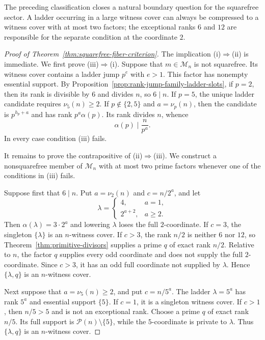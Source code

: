 The preceding classification closes a natural boundary question for the
squarefree sector.  A ladder occurring in a large witness cover can always be
compressed to a witness cover with at most two factors; the exceptional ranks
$6$ and $12$ are responsible for the separate condition at the coordinate
$2$.

\begin{proof}[Proof of Theorem~\ref{thm:squarefree-fiber-criterion}]
The implication \textup{(i)}$\Rightarrow$\textup{(ii)} is immediate.  We first
prove \textup{(iii)}$\Rightarrow$\textup{(i)}.  Suppose that
$m\in\mathcal M_n$ is not squarefree.  Its witness cover contains a ladder
jump $p^e$ with $e>1$.  This factor has nonempty essential support.  By
Proposition~\ref{prop:rank-jump-family-ladder-slots}, if $p=2$, then its rank
is divisible by $6$ and divides $n$, so $6\mid n$.  If $p=5$, the unique
ladder candidate requires $\nu_5(n)\geq2$.  If $p\notin\{2,5\}$ and
$a=\nu_p(n)$, then the candidate is $p^{h_p+a}$ and has rank
$p^a\alpha(p)$.  Its rank divides $n$, whence
\[
 \alpha(p)\mid \frac{n}{p^a}.
\]
In every case condition \textup{(iii)} fails.

It remains to prove the contrapositive of
\textup{(ii)}$\Rightarrow$\textup{(iii)}.  We construct a nonsquarefree
member of $\mathcal M_n$ with at most two prime factors whenever one of the
conditions in \textup{(iii)} fails.

Suppose first that $6\mid n$.  Put $a=\nu_2(n)$ and $c=n/2^a$, and let
\[
 \lambda=
 \begin{cases}
 4,&a=1,\\
 2^{a+2},&a\geq2.
 \end{cases}
\]
Then $\alpha(\lambda)=3\cdot2^a$ and lowering $\lambda$ loses the full
$2$-coordinate.  If $c=3$, the singleton $\{\lambda\}$ is an $n$-witness
cover.  If $c>3$, the rank $n/2$ is neither $6$ nor $12$, so
Theorem~\ref{thm:primitive-divisors} supplies a prime $q$ of exact rank
$n/2$.  Relative to $n$, the factor $q$ supplies every odd coordinate and
does not supply the full $2$-coordinate.  Since $c>3$, it has an odd full
coordinate not supplied by $\lambda$.  Hence $\{\lambda,q\}$ is an
$n$-witness cover.

Next suppose that $a=\nu_5(n)\geq2$, and put $c=n/5^a$.  The ladder
$\lambda=5^a$ has rank $5^a$ and essential support $\{5\}$.  If $c=1$, it
is a singleton witness cover.  If $c>1$, then $n/5>5$ and is not an
exceptional rank.  Choose a prime $q$ of exact rank $n/5$.  Its full support
is $\mathcal P(n)\setminus\{5\}$, while the $5$-coordinate is private to
$\lambda$.  Thus $\{\lambda,q\}$ is an $n$-witness cover.


\end{proof}
